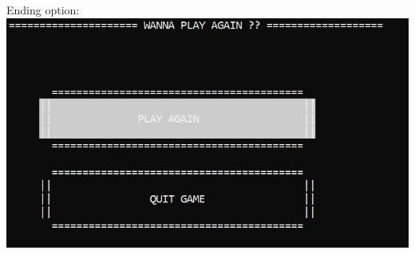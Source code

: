 \documentclass[12pt,a4paper]{article}
\begin{document}
Ending option: \\
\includegraphics[scale=0.7]{picture/PlayAgain.jpg}\\
\end{document}
